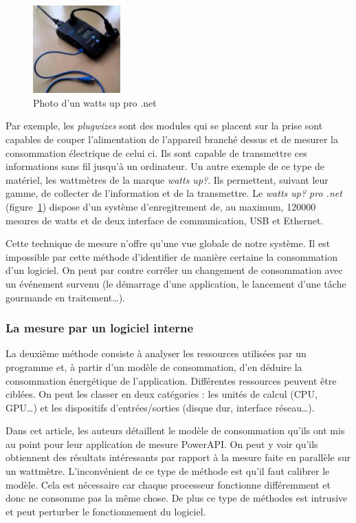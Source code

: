 \documentclass[a4paper, 11pt]{report}
\begin{document}
\begin{figure}
		\includegraphics[width=0.3\textwidth]{figures/wattsUp}
		\caption{Photo d'un watts up pro .net}
		\label{wattsUp}
\end{figure}

Par exemple, les \textit{plugwizes} sont des modules qui se placent sur la prise sont capables de couper l'alimentation de l'appareil branché dessus et de mesurer la consommation électrique de celui ci. Ils sont capable de transmettre ces informations sans fil jusqu'à un ordinateur. Un autre exemple de ce type de matériel, les wattmètres de la marque \textit{watts up\/?}. Ils permettent, suivant leur gamme, de collecter de l'information et de la transmettre. Le \textit{watts up\/? pro .net} (figure~\ref{wattsUp}) dispose d'un système d'enregitrement de, au maximum, 120000 mesures de watts et de deux interface de communication, USB et Ethernet.

Cette technique de mesure n'offre qu'une vue globale de notre système. Il est impossible par cette méthode d'identifier de manière certaine la consommation d'un logiciel. On peut par contre corréler un changement de consommation avec un événement survenu\cite{GreenMining} (le démarrage d'une application, le lancement d'une tâche gourmande en traitement\ldots). 

			\subsubsection{La mesure par un logiciel interne}
La deuxième méthode consiste à analyser les ressources utilisées par un programme et, à partir d'un modèle de consommation, d'en déduire la consommation énergétique de l'application. Différentes ressources peuvent être ciblées. On peut les classer en deux catégories : les unités de calcul (CPU, GPU\ldots) et les dispositifs d'entrées/sorties (disque dur, interface réseau\ldots).

Dans cet article\cite{noureddine:hal-00681560}, les auteurs détaillent le modèle de consommation qu'ils ont mis au point pour leur application de mesure PowerAPI. On peut y voir qu'ils obtiennent des résultats intéressants par rapport à la mesure faite en parallèle sur un wattmètre. L'inconvénient de ce type de méthode est qu'il faut calibrer le modèle. Cela est nécessaire car chaque processeur  fonctionne différemment et donc ne consomme pas la même chose. De plus ce type de méthodes est intrusive et peut perturber le fonctionnement du logiciel.
\end{document}
